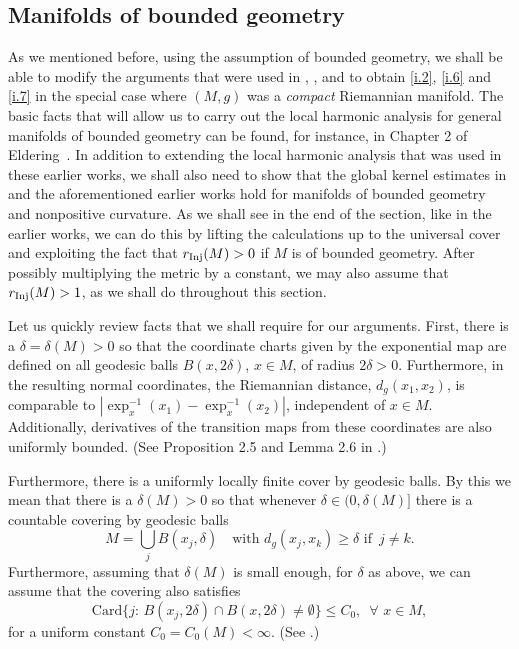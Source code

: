\documentclass[10pt]{amsart}
\newcommand{\newsection}[1]
{\subsection{#1}\setcounter{theorem}{0} \setcounter{equation}{0}
\par\noindent}
\newcommand{\Inj}{r_{\rm{Inj}}}
\newcommand{\1}{{\bf 1}}
\begin{document}
\newsection{Manifolds of bounded geometry}


As we mentioned before, using the assumption of bounded geometry, we shall be able to  modify the arguments that were
used in \cite{BHSsp}, \cite{SBLOg}, \cite{HSp} and \cite{HSst} to obtain \eqref{i.2}, \eqref{i.6} and \eqref{i.7} in the special
case where $(M,g)$ was a {\em compact} Riemannian manifold.  The basic facts that will allow us to carry out the
local harmonic analysis for general manifolds of bounded geometry can be found, for instance, in 
Chapter 2 of Eldering~\cite{normhyp}.  In addition to extending the local harmonic analysis that was used in these
earlier works, we shall also need to show that the global kernel estimates in \cite{BSTop} and the aforementioned earlier
works hold for manifolds of bounded geometry and nonpositive curvature.  As we shall see in the end of the section,
like in the earlier works, we can do this by lifting the calculations up to the universal cover and exploiting the fact that
$\Inj(M)>0$ if $M$ is of bounded geometry.  After possibly multiplying the metric by a constant, we may also assume
that $\Inj(M)> 1$, as we shall do throughout this section.


Let us quickly review facts that we shall require for our arguments.  First, there is a $\delta=\delta(M)>0$ so that the coordinate
charts given by the exponential map are defined on all geodesic balls $B(x,2\delta)$, $x\in M$, of radius $2\delta>0$.
Furthermore, in the resulting normal coordinates, the Riemannian distance, $d_g(x_1,x_2)$, is comparable to
$|\exp^{-1}_x(x_1)-\exp^{-1}_x(x_2)|$, independent of $x\in M$.  
Additionally, derivatives of the transition maps from these coordinates are also uniformly bounded.
(See Proposition 2.5 and Lemma 2.6 in  \cite{normhyp}.)


Furthermore, there is a uniformly locally finite cover by geodesic balls.  
By this we mean that there is a $\delta(M)>0$ so that whenever $\delta\in (0,\delta(M)]$ there is a countable
covering by geodesic balls
\begin{equation}\label{b.0}
M=\bigcup_{j}B(x_j,\delta) \quad \text{with } 
d_g(x_j,x_k)\ge \delta \, \, \text{if } \, j\ne k.
\end{equation}
Furthermore, assuming that $\delta(M)$ is small enough, for $\delta$ as above, we can
assume that the covering also satisfies
\begin{equation}\label{b.00}
\text{Card} \bigl\{j: \, B(x_j,2\delta)\cap B(x,2\delta)\ne \emptyset \bigr\}\le C_0, \, \, 
\, \forall \, \, x\in M,
\end{equation}
 for a uniform constant $C_0=C_0(M)<\infty$. 
(See \cite[Lemma 2.16]{Borthwick}.)   
\end{document}
